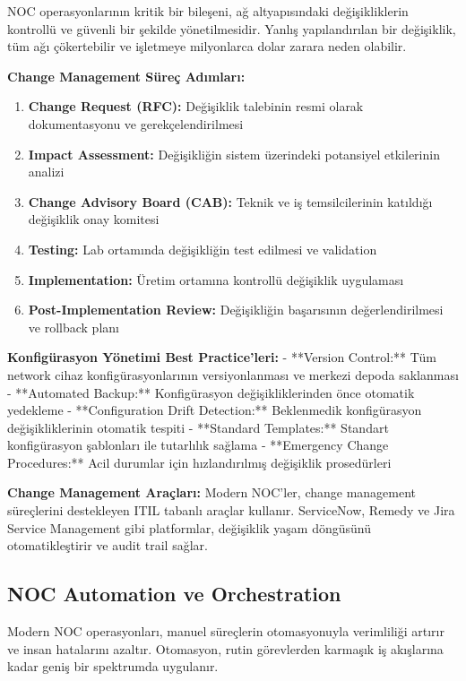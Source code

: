 NOC operasyonlarının kritik bir bileşeni, ağ altyapısındaki değişikliklerin kontrollü ve güvenli bir şekilde yönetilmesidir. Yanlış yapılandırılan bir değişiklik, tüm ağı çökertebilir ve işletmeye milyonlarca dolar zarara neden olabilir.

\textbf{Change Management Süreç Adımları:}
\begin{enumerate}
    \item \textbf{Change Request (RFC):} Değişiklik talebinin resmi olarak dokumentasyonu ve gerekçelendirilmesi
    \item \textbf{Impact Assessment:} Değişikliğin sistem üzerindeki potansiyel etkilerinin analizi
    \item \textbf{Change Advisory Board (CAB):} Teknik ve iş temsilcilerinin katıldığı değişiklik onay komitesi
    \item \textbf{Testing:} Lab ortamında değişikliğin test edilmesi ve validation
    \item \textbf{Implementation:} Üretim ortamına kontrollü değişiklik uygulaması
    \item \textbf{Post-Implementation Review:} Değişikliğin başarısının değerlendirilmesi ve rollback planı
\end{enumerate}

\textbf{Konfigürasyon Yönetimi Best Practice'leri:}
- **Version Control:** Tüm network cihaz konfigürasyonlarının versiyonlanması ve merkezi depoda saklanması
- **Automated Backup:** Konfigürasyon değişikliklerinden önce otomatik yedekleme
- **Configuration Drift Detection:** Beklenmedik konfigürasyon değişikliklerinin otomatik tespiti
- **Standard Templates:** Standart konfigürasyon şablonları ile tutarlılık sağlama
- **Emergency Change Procedures:** Acil durumlar için hızlandırılmış değişiklik prosedürleri

\textbf{Change Management Araçları:}
Modern NOC'ler, change management süreçlerini destekleyen ITIL tabanlı araçlar kullanır. ServiceNow, Remedy ve Jira Service Management gibi platformlar, değişiklik yaşam döngüsünü otomatikleştirir ve audit trail sağlar.

\subsection{NOC Automation ve Orchestration}

Modern NOC operasyonları, manuel süreçlerin otomasyonuyla verimliliği artırır ve insan hatalarını azaltır. Otomasyon, rutin görevlerden karmaşık iş akışlarına kadar geniş bir spektrumda uygulanır.

